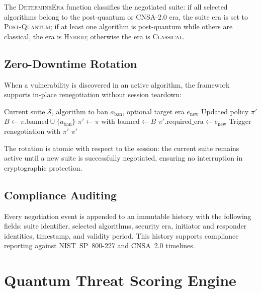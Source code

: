 \documentclass[conference,10pt]{IEEEtran}
\begin{document}
The \textsc{DetermineEra} function classifies the negotiated suite:
if all selected algorithms belong to the post-quantum or CNSA-2.0 era,
the suite era is set to \textsc{Post-Quantum}; if at least one algorithm
is post-quantum while others are classical, the era is \textsc{Hybrid};
otherwise the era is \textsc{Classical}.

\subsection{Zero-Downtime Rotation}

When a vulnerability is discovered in an active algorithm, the framework
supports in-place renegotiation without session teardown:

\begin{algorithm}[t]
\caption{Zero-Downtime Algorithm Rotation}
\label{alg:rotate}
\begin{algorithmic}[1]
\REQUIRE Current suite $\mathcal{S}$, algorithm to ban $a_{\text{ban}}$, optional target era $e_{\text{new}}$
\ENSURE Updated policy $\pi'$
\STATE $B \leftarrow \pi.\text{banned} \cup \{a_{\text{ban}}\}$
\STATE $\pi' \leftarrow \pi$ with $\text{banned} \leftarrow B$
  \STATE $\pi'.\text{required\_era} \leftarrow e_{\text{new}}$
\ENDIF
\STATE Trigger renegotiation with $\pi'$
\RETURN $\pi'$
\end{algorithmic}
\end{algorithm}

The rotation is atomic with respect to the session: the current suite
remains active until a new suite is successfully negotiated, ensuring no
interruption in cryptographic protection.

\subsection{Compliance Auditing}

Every negotiation event is appended to an immutable history with the
following fields: suite identifier, selected algorithms, security era,
initiator and responder identities, timestamp, and validity period. This
history supports compliance reporting against NIST~SP~800-227 and
CNSA~2.0 timelines.

\section{Quantum Threat Scoring Engine}\label{sec:scoring}
\end{document}
